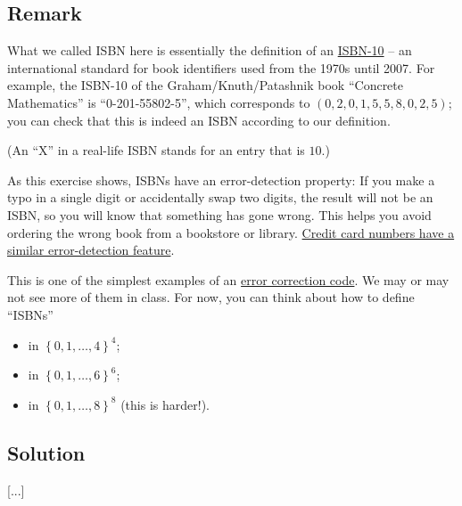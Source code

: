 \documentclass[paper=a4, fontsize=12pt]{scrartcl} %
\newcommand{\set}[1]{\left\{ #1 \right\}}
\newcommand{\tup}[1]{\left( #1 \right)}
\theoremstyle{plainsl}
\theoremstyle{definition}
\theoremstyle{remark}
\begin{document}
\subsection{Remark}

What we called ISBN here is essentially the definition
of an \href{https://en.wikipedia.org/wiki/International_Standard_Book_Number#ISBN-10_check_digits}{ISBN-10}
-- an international standard for book identifiers used from the
1970s until 2007.
For example, the ISBN-10 of the Graham/Knuth/Patashnik
book ``Concrete Mathematics'' is ``0-201-55802-5'', which corresponds
to $\tup{0, 2, 0, 1, 5, 5, 8, 0, 2, 5}$; you can check
that this is indeed an ISBN according to our definition.

(An ``X'' in a real-life ISBN stands for an entry that
is $10$.)

As this exercise shows, ISBNs have an error-detection
property:
If you make a typo in a single digit or accidentally swap
two digits, the result will not be an ISBN, so you will
know that something has gone wrong.
This helps you avoid ordering the wrong book from a bookstore
or library.
\href{https://en.wikipedia.org/wiki/Luhn_algorithm}{Credit card numbers have a similar error-detection feature}.

This is one of the simplest examples of an
\href{https://en.wikipedia.org/wiki/Error_correction_code}{error correction code}.
We may or may not see more of them in class.
For now, you can think about how to define ``ISBNs''
\begin{itemize}
\item in $\set{0, 1, \ldots, 4}^4$;
\item in $\set{0, 1, \ldots, 6}^6$;
\item in $\set{0, 1, \ldots, 8}^8$ (this is harder!).
\end{itemize}

\subsection{Solution}

[...]

\begin{thebibliography}{99999999}                                                                                         %


\end{thebibliography}
\end{document}
